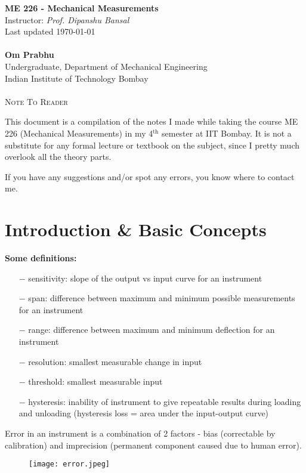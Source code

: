 \documentclass[11pt]{article}
\theoremstyle{definition}
\begin{document}
\begin{center}
{\LARGE \bf ME 226 - Mechanical Measurements}\\
{Instructor: \textit{Prof. Dipanshu Bansal}}\\
Last updated \today \\~\\
{\large \bf Om Prabhu}\\
Undergraduate, Department of Mechanical Engineering\\
Indian Institute of Technology Bombay\\~\\
\textsc{Note To Reader}
\end{center}
\vspace{-6pt}

This document is a compilation of the notes I made while taking the course ME 226 (Mechanical Measurements) in my 4$^{\text{th}}$ semester at IIT Bombay. It is not a substitute for any formal lecture or textbook on the subject, since I pretty much overlook all the theory parts.

If you have any suggestions and/or spot any errors, you know where to contact me.
\vspace{-3mm}

\hrulefill
\section{Introduction \& Basic Concepts}
\textbf{\large Some definitions:}
\vspace{-3.5mm}
\begin{itemize}
	\itemsep-0.2em
	\item[$-$] sensitivity: slope of the output vs input curve for an instrument
	\item[$-$] span: difference between maximum and minimum possible measurements for an instrument
	\item[$-$] range: difference between maximum and minimum deflection for an instrument
	\item[$-$] resolution: smallest measurable change in input
	\item[$-$] threshold: smallest measurable input
	\item[$-$] hysteresis: inability of instrument to give repeatable results during loading and unloading (hysteresis loss = area under the input-output curve)
\end{itemize}
\vspace{-3.5mm}
Error in an instrument is a combination of 2 factors - bias (correctable by calibration) and imprecision (permanent component caused due to human error).
\vspace{-3.5mm}
\begin{wrapfigure}[7]{L}{0.4\textwidth}
\texttt{[image: error.jpeg]}
\end{wrapfigure}
\end{document}
